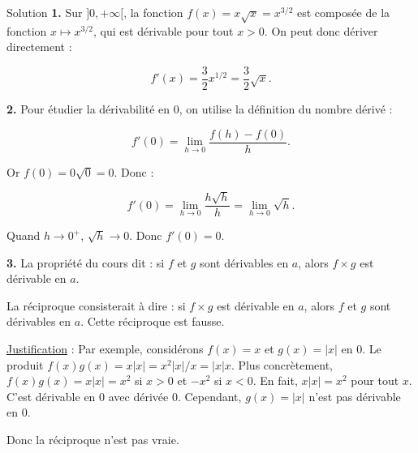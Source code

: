 \documentclass[a4paper,12pt]{article}
\begin{document}
\begin{solutionbox}{Solution}
    \textbf{1.} Sur $]0,+\infty[$, la fonction $f(x)=x\sqrt{x}=x^{3/2}$ est composée de la fonction $x \mapsto x^{3/2}$, qui est dérivable pour tout $x>0$. On peut donc dériver directement :
    
    \[
    f'(x)=\frac{3}{2}x^{1/2}=\frac{3}{2}\sqrt{x}.
    \]
    
    \textbf{2.} Pour étudier la dérivabilité en $0$, on utilise la définition du nombre dérivé :
    
    \[
    f'(0)=\lim_{h \to 0}\frac{f(h)-f(0)}{h}.
    \]
    
    Or $f(0)=0\sqrt{0}=0$. Donc :
    
    \[
    f'(0)=\lim_{h \to 0}\frac{h\sqrt{h}}{h}=\lim_{h \to 0}\sqrt{h}.
    \]
    
    Quand $h \to 0^+$, $\sqrt{h} \to 0$. Donc $f'(0)=0$.
    
    \textbf{3.} La propriété du cours dit : si $f$ et $g$ sont dérivables en $a$, alors $f \times g$ est dérivable en $a$.
    
    La réciproque consisterait à dire : si $f \times g$ est dérivable en $a$, alors $f$ et $g$ sont dérivables en $a$. Cette réciproque est fausse.
    
    \underline{Justification} : Par exemple, considérons $f(x)=x$ et $g(x)=|x|$ en $0$. Le produit $f(x)g(x)=x|x|=x^2|x|/x=|x|x$. Plus concrètement, $f(x)g(x)=x|x|=x^2$ si $x>0$ et $-x^2$ si $x<0$. En fait, $x|x|=x^2$ pour tout $x$. C’est dérivable en $0$ avec dérivée $0$. Cependant, $g(x)=|x|$ n’est pas dérivable en $0$.
    
    Donc la réciproque n’est pas vraie.
\end{solutionbox}
    
    
\end{document}

